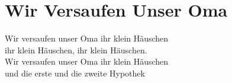 \section{Wir Versaufen Unser Oma}
Wir versaufen unser Oma ihr klein Häuschen\\
ihr klein Häuschen, ihr klein Häuschen.\\
Wir versaufen unser Oma ihr klein Häuschen\\
und die erste und die zweite Hypothek

